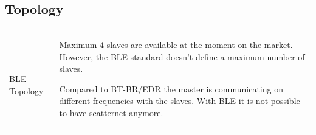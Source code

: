 	\subsection{Topology}
		\begin{tabular}{ll}
			\parbox{9cm}{
				 \\ BLE Topology 
			}	
			& \parbox{9cm}{
				Maximum 4 slaves are available at the moment on the market. However, the BLE standard doesn't define a maximum number of slaves.
				
				Compared to BT-BR/EDR the master is communicating on different frequencies with the slaves.
				With BLE it is not possible to have scatternet anymore.
			}	
		\end{tabular}
		
